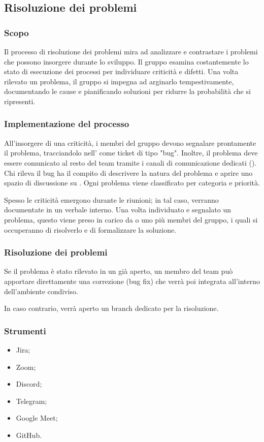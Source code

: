\subsection{Risoluzione dei problemi}\label{risoluzione_problemi}

\subsubsection{Scopo}
\par Il processo di risoluzione dei problemi mira ad analizzare e contrastare i problemi che possono insorgere durante lo sviluppo. Il gruppo esamina costantemente lo stato di esecuzione dei processi per individuare criticità e difetti. Una volta rilevato un problema, il gruppo si impegna ad arginarlo tempestivamente, documentando le cause e pianificando soluzioni per ridurre la probabilità che si ripresenti. 

\subsubsection{Implementazione del processo}
\par All'insorgere di una criticità, i membri del gruppo devono segnalare prontamente il problema, tracciandolo nell’ come ticket di tipo "bug". Inoltre, il problema deve essere comunicato al resto del team tramite i canali di comunicazione dedicati (). Chi rileva il bug ha il compito di descrivere la natura del problema e aprire uno spazio di discussione su . Ogni problema viene classificato per categoria e priorità.
\par Spesso le criticità emergono durante le riunioni; in tal caso, verranno documentate in un verbale interno. Una volta individuato e segnalato un problema, questo viene preso in carico da o uno più membri del gruppo, i quali si occuperanno di risolverlo e di formalizzare la soluzione.

\subsubsection{Risoluzione dei problemi}
\par Se il problema è stato rilevato in un  già aperto, un membro del team può apportare direttamente una correzione (bug fix) che verrà poi integrata all'interno dell'ambiente condiviso.
\par In caso contrario, verrà aperto un branch dedicato per la risoluzione. 

\subsubsection{Strumenti}
\IntroStrumenti
\begin{itemize}
    \item Jira;
    \item Zoom;
    \item Discord;
    \item Telegram;
    \item Google Meet;
    \item GitHub.
\end{itemize}